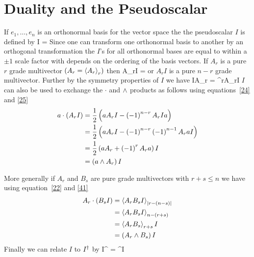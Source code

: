 \section{Duality and the Pseudoscalar}
If $e_{1},\dots,e_{n}$ is an orthonormal basis for the vector space the the pseudoscalar $I$ is defined by
\be\label{40}
	I = 
\ee
Since one can transform one orthonormal basis to another by an orthogonal transformation the $I$'s for all
orthonormal bases are equal to within a $\pm 1$ scale factor with depends on the ordering of the basis vectors.
If $A_{r}$ is a pure $r$ grade multivector $\left ( {A_{r} = \left \langle {A_{r}}\right \rangle_{r}} \right )$ then
\be\label{41}
	A_{r}I = 
\ee
or $A_{r}I$ is a pure $n-r$ grade multivector.  Further by the symmetry properties of $I$ we have
\be\label{42}
	IA_{r} = ^{r}A_{r}I
\ee
$I$ can also be used to exchange the $\cdot$ and $\wedge$ products as follows using equations~\ref{24} and
\ref{25}
\begin{align}
	a\cdot\left ( {A_{r}I} \right ) & =  \displaystyle\frac{1}{2}\left ( {aA_{r}I-\left ( {-1} \right )^{n-r}A_{r}Ia} \right ) \\
						 & =  \displaystyle\frac{1}{2}\left ( {aA_{r}I-\left ( {-1} \right )^{n-r}\left ( {-1} \right )^{n-1}A_{r}aI} \right ) \\
                         & =  \displaystyle\frac{1}{2}\left ( {aA_{r}+\left ( {-1} \right )^{r}A_{r}a} \right ) I \\
						 & = \left ( {a\wedge A_{r}} \right ) I \label{25a}
\end{align}

More generally if $A_{r}$ and $B_{s}$ are pure grade multivectors with $r+s \le n$ we have using
equation~\ref{22} and \ref{41}
\begin{align}
	A_{r}\cdot\left ( {B_{s}I} \right ) & = \left \langle {A_{r}B_{s}I}\right \rangle_{\left | {r-\left ( {n-s} \right )} \right |} \\
							 & = \left \langle {A_{r}B_{s}I}\right \rangle_{n-\left ( {r+s} \right )} \\
							 & = \left \langle {A_{r}B_{s}}\right \rangle_{r+s}I \\
							 & = \left ( {A_{r}\wedge B_{s}} \right ) I
\end{align}
Finally we can relate $I$ to $I^{\dagger}$ by
\be
	I^{\R} = ^{}I
\ee
